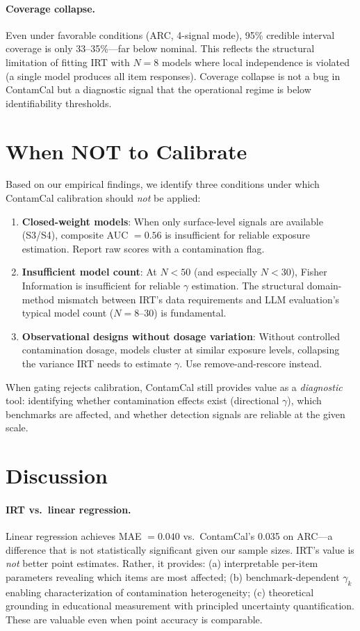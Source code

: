 \documentclass[11pt,a4paper]{article}
\begin{document}
\paragraph{Coverage collapse.} Even under favorable conditions (ARC, 4-signal mode), 95\% credible interval coverage is only 33--35\%---far below nominal. This reflects the structural limitation of fitting IRT with $N = 8$ models where local independence is violated (a single model produces all item responses). Coverage collapse is not a bug in ContamCal but a diagnostic signal that the operational regime is below identifiability thresholds.

\section{When NOT to Calibrate}

Based on our empirical findings, we identify three conditions under which ContamCal calibration should \emph{not} be applied:

\begin{enumerate}
\item \textbf{Closed-weight models}: When only surface-level signals are available (S3/S4), composite AUC $= 0.56$ is insufficient for reliable exposure estimation. Report raw scores with a contamination flag.
\item \textbf{Insufficient model count}: At $N < 50$ (and especially $N < 30$), Fisher Information is insufficient for reliable $\gamma$ estimation. The structural domain-method mismatch between IRT's data requirements and LLM evaluation's typical model count ($N = 8$--$30$) is fundamental.
\item \textbf{Observational designs without dosage variation}: Without controlled contamination dosage, models cluster at similar exposure levels, collapsing the variance IRT needs to estimate $\gamma$. Use remove-and-rescore instead.
\end{enumerate}

When gating rejects calibration, ContamCal still provides value as a \emph{diagnostic} tool: identifying whether contamination effects exist (directional $\gamma$), which benchmarks are affected, and whether detection signals are reliable at the given scale.

\section{Discussion}

\paragraph{IRT vs.\ linear regression.} Linear regression achieves MAE $= 0.040$ vs.\ ContamCal's 0.035 on ARC---a difference that is not statistically significant given our sample sizes. IRT's value is \emph{not} better point estimates. Rather, it provides: (a) interpretable per-item parameters revealing which items are most affected; (b) benchmark-dependent $\gamma_k$ enabling characterization of contamination heterogeneity; (c) theoretical grounding in educational measurement with principled uncertainty quantification. These are valuable even when point accuracy is comparable.
\end{document}
